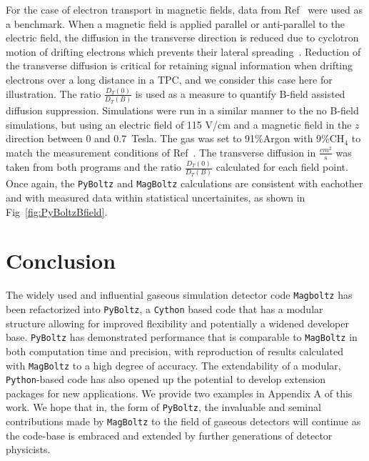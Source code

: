 \documentclass[3p,11pt]{elsarticle}
\begin{document}
For the case of electron transport in magnetic fields, data from Ref~\cite{amendolia1986dependence} were used as a benchmark. When a magnetic field is applied parallel or anti-parallel to the electric field, the diffusion in the transverse direction is reduced due to cyclotron motion of drifting electrons which prevents their lateral spreading~\cite{Nygren:1978rx}. Reduction of the transverse diffusion is critical for retaining signal information when drifting electrons over a long distance in a TPC, and we consider this case here for illustration. The ratio $\frac{D_T(0)}{D_T(B)}$  is used as a measure to quantify B-field assisted diffusion suppression. Simulations were run in a similar manner to the no B-field simulations, but using an electric field of 115 V/cm and a magnetic field in the $z$ direction between 0 and 0.7~Tesla. The gas was set to 91\%Argon with 9\%CH$_4$ to match the measurement conditions of Ref~\cite{amendolia1986dependence}. 
The transverse diffusion in $\frac{cm^2}{s}$ was taken from both programs and the ratio $\frac{D_T(0)}{D_T(B)}$ calculated for each field point. Once again, the {\tt PyBoltz} and {\tt MagBoltz} calculations are consistent with eachother and with measured data within statistical uncertainites, as shown in Fig~\ref{fig:PyBoltzBfield}.


\section{Conclusion}
\label{Conclusion}
The widely used and influential gaseous simulation detector code {\tt Magboltz} has been refactorized into {\tt PyBoltz}, a {\tt Cython} based code that has a modular structure allowing for improved flexibility and potentially a widened developer base.  {\tt PyBoltz} has demonstrated performance that is comparable to {\tt MagBoltz} in both computation time and precision, with reproduction of results calculated with { \tt MagBoltz} to a high degree of accuracy.  The extendability of a modular, {\tt Python}-based code has also opened up the potential to develop extension packages for new applications.  We provide two examples in Appendix A of this work.  We hope that in, the form of {\tt PyBoltz}, the invaluable and seminal contributions made by {\tt MagBoltz} to the field of gaseous detectors will continue as the code-base is embraced and extended by further generations of detector physicists.
\end{document}
